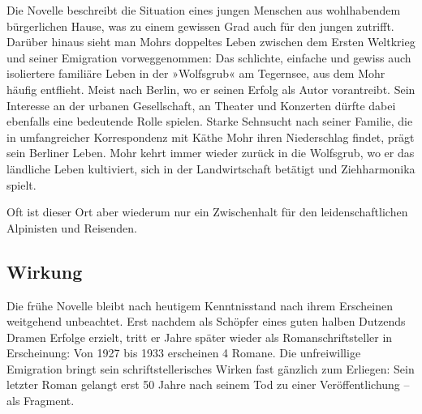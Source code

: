 \begin{small}
Die Novelle beschreibt die Situation eines jungen
Menschen aus wohlhabendem bürgerlichen Hause, was
zu einem gewissen Grad auch für
den jungen \buchautor{} zutrifft. Darüber hinaus sieht
man Mohrs doppeltes Leben zwischen dem Ersten
Weltkrieg und seiner Emigration vorweggenommen: Das
schlichte, einfache und gewiss auch isoliertere%
familiäre Leben in der »Wolfsgrub« am Tegernsee, aus dem Mohr häufig
entflieht. Meist nach Berlin, wo er seinen Erfolg als
Autor vorantreibt.%
Sein Interesse an der urbanen Gesellschaft, an Theater und Konzerten
dürfte dabei ebenfalls eine bedeutende Rolle spielen. Starke Sehnsucht
nach seiner Familie, die in umfangreicher Korrespondenz mit
Käthe Mohr ihren Niederschlag findet,
prägt sein Berliner Leben. Mohr kehrt immer wieder zurück in die Wolfsgrub,
wo er das ländliche Leben kultiviert, sich in der Landwirtschaft betätigt
und Ziehharmonika spielt.%

Oft ist dieser Ort aber wiederum nur ein Zwischenhalt für den leidenschaftlichen
Alpinisten und Reisenden.


\subsection{Wirkung}

\noindent{}Die frühe Novelle \textit{\buchtitel{}} bleibt nach heutigem
Kenntnisstand nach ihrem Erscheinen weitgehend unbeachtet.
Erst nachdem \buchautor{} als Schöpfer eines guten halben Dutzends
Dramen Erfolge erzielt,
tritt er Jahre später wieder als Romanschriftsteller in Erscheinung:
Von 1927 bis 1933 erscheinen 4 Romane.
Die unfreiwillige Emigration bringt sein schriftstellerisches Wirken
fast gänzlich zum Erliegen: Sein letzter Roman gelangt erst
50 Jahre nach seinem Tod zu einer Veröffentlichung – als Fragment.%


\end{small}
